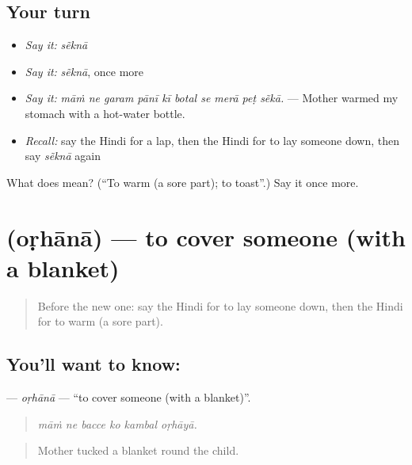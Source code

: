 \subsection*{Your turn}
\begin{itemize}
\raggedright
  \item \emph{Say it:} \emph{sẽknā}
  \item \emph{Say it:} \emph{sẽknā}, once more
  \item \emph{Say it:} \emph{māṁ ne garam pānī kī botal se merā peṭ sẽkā.} — Mother warmed my stomach with a hot-water bottle.
  \item \emph{Recall:} say the Hindi for a lap, then the Hindi for to lay someone down, then say \emph{sẽknā} again
\end{itemize}

\begin{tcolorbox}[breakable,colback=teal!4,colframe=teal!35!black,title={Before you move on}]
What does  mean? (\textquotedblleft{}To warm (a sore part); to toast\textquotedblright{}.) Say it once more.
\end{tcolorbox}
\section[\texorpdfstring{\hi{ओढ़ाना} (oṛhānā)}{ओढ़ाना (oṛhānā)}]{ (oṛhānā) — to cover someone (with a blanket)}

\label{lesson:HI-C494-orhana}



\begin{quote}
Before the new one: say the Hindi for to lay someone down, then the Hindi for to warm (a sore part).
\end{quote}

\subsection*{You'll want to know: }
\textbf{} — \emph{oṛhānā} — \textquotedblleft{}to cover someone (with a blanket)\textquotedblright{}.

\begin{quote}
     
\end{quote}

\begin{quote}
\emph{māṁ ne bacce ko kambal oṛhāyā.}
\end{quote}

\begin{quote}
Mother tucked a blanket round the child.
\end{quote}

